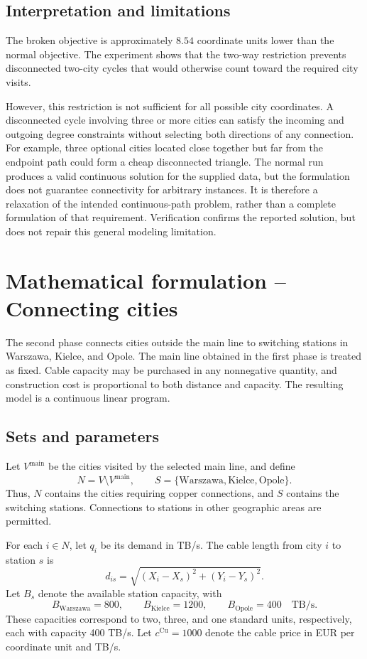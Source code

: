 \documentclass[11pt,a4paper]{article}
\begin{document}
\subsection{Interpretation and limitations}
The broken objective is approximately $8.54$ coordinate units lower than the normal objective. The experiment shows that the two-way restriction prevents disconnected two-city cycles that would otherwise count toward the required city visits.

However, this restriction is not sufficient for all possible city coordinates. A disconnected cycle involving three or more cities can satisfy the incoming and outgoing degree constraints without selecting both directions of any connection. For example, three optional cities located close together but far from the endpoint path could form a cheap disconnected triangle. The normal run produces a valid continuous solution for the supplied data, but the formulation does not guarantee connectivity for arbitrary instances. It is therefore a relaxation of the intended continuous-path problem, rather than a complete formulation of that requirement. Verification confirms the reported solution, but does not repair this general modeling limitation.

\section{Mathematical formulation -- Connecting cities}
\label{sec:copper-model}
The second phase connects cities outside the main line to switching stations in Warszawa, Kielce, and Opole. The main line obtained in the first phase is treated as fixed. Cable capacity may be purchased in any nonnegative quantity, and construction cost is proportional to both distance and capacity. The resulting model is a continuous linear program.

\subsection{Sets and parameters}
Let $V^{\mathrm{main}}$ be the cities visited by the selected main line, and define
\[
N=V\setminus V^{\mathrm{main}},
\qquad S=\{\text{Warszawa},\text{Kielce},\text{Opole}\}.
\]
Thus, $N$ contains the cities requiring copper connections, and $S$ contains the switching stations. Connections to stations in other geographic areas are permitted.

For each $i\in N$, let $q_i$ be its demand in TB/s. The cable length from city $i$ to station $s$ is
\begin{equation}
d_{is}=\sqrt{(X_i-X_s)^2+(Y_i-Y_s)^2}.
\end{equation}
Let $B_s$ denote the available station capacity, with
\[
B_{\text{Warszawa}}=800,\qquad
B_{\text{Kielce}}=1200,\qquad
B_{\text{Opole}}=400
\quad\text{TB/s}.
\]
These capacities correspond to two, three, and one standard units, respectively, each with capacity 400 TB/s. Let $c^{\mathrm{Cu}}=1000$ denote the cable price in EUR per coordinate unit and TB/s.
\end{document}
